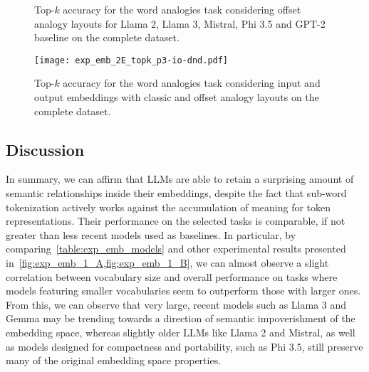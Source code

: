 \begin{figure}[t!]
    \centering
    \caption[Top-$k$ accuracy for the word analogies task considering offset analogy layouts for various models on the complete dataset.]{Top-$k$ accuracy for the word analogies task considering offset analogy layouts for Llama 2, Llama 3, Mistral, Phi 3.5 and GPT-2 baseline on the complete dataset.}
    \label{fig:exp_emb_2_E}
\end{figure}
\begin{figure}[t!]
    \centering
    \texttt{[image: exp\_emb\_2E\_topk\_p3-io-dnd.pdf]}
    \caption{Top-$k$ accuracy for the word analogies task considering input and output embeddings with classic and offset analogy layouts on the complete dataset.}
    \label{fig:exp_emb_2_E3}
\end{figure}

\subsection{Discussion}\label{ssec:exp_emb_discussion}

In summary, we can affirm that LLMs are able to retain a surprising amount of semantic relationships inside their embeddings, despite the fact that sub-word tokenization actively works against the accumulation of meaning for token representations.
Their performance on the selected tasks is comparable, if not greater than less recent models used as baselines.
In particular, by comparing~\cref{table:exp_emb_models} and other experimental results presented in~\cref{fig:exp_emb_1_A,fig:exp_emb_1_B}, we can almost observe a slight correlation between vocabulary size and overall performance on tasks where models featuring smaller vocabularies seem to outperform those with larger ones.
From this, we can observe that very large, recent models such as Llama 3 and Gemma may be trending towards a direction of semantic impoverishment of the embedding space, whereas slightly older LLMs like Llama 2 and Mistral, as well as models designed for compactness and portability, such as Phi 3.5, still preserve many of the original embedding space properties.

